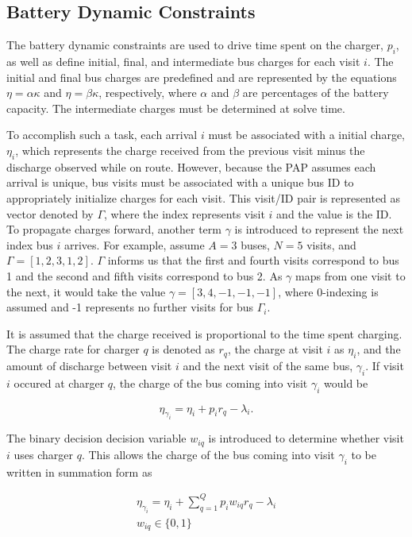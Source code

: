 \documentclass[letterpaper, 10pt, conference]{IEEEtran}
\begin{document}
\subsection{Battery Dynamic Constraints}
The battery dynamic constraints are used to drive time spent on the charger, $p_i$, as well as define initial, final, and intermediate bus charges for each visit $i$. The initial and final bus charges are predefined and are represented by the equations $\eta = \alpha \kappa$ and $\eta = \beta \kappa$, respectively, where $\alpha$ and $\beta$ are percentages of the battery capacity. The intermediate charges must be determined at solve time.

To accomplish such a task, each arrival $i$ must be associated with a initial charge, $\eta_i$, which represents the charge received from the previous visit minus the discharge observed while on route. However, because the PAP assumes each arrival is unique, bus visits must be associated with a unique bus ID to appropriately initialize charges for each visit. This visit/ID pair is represented as vector denoted by $\Gamma$, where the index represents visit $i$ and the value is the ID. To propagate charges forward, another term $\gamma$ is introduced to represent the next index bus $i$ arrives. For example, assume $A = 3$ buses, $N = 5$ visits, and $\Gamma = [1,2,3,1,2]$. $\Gamma$ informs us that the first and fourth visits correspond to bus 1 and the second and fifth visits correspond to bus 2. As $\gamma$ maps from one visit to the next, it would take the value $\gamma = [3,4,-1,-1,-1]$, where 0-indexing is assumed and -1 represents no further visits for bus $\Gamma_i$.

It is assumed that the charge received is proportional to the time spent charging. The charge rate for charger $q$ is denoted as $r_q$, the charge at visit $i$ as $\eta_i$, and the amount of discharge between visit $i$ and the next visit of the same bus, $\gamma_i$. If visit $i$ occured at charger $q$, the charge of the bus coming into visit $\gamma_i$ would be

\begin{equation}
	\eta_{\gamma_i} = \eta_i + p_i r_q - \lambda_i.
\end{equation}

The binary decision decision variable $w_{iq}$ is introduced to determine whether visit $i$ uses charger $q$. This allows the charge of the bus coming into visit $\gamma_i$ to be written in summation form as

\begin{subequations}
\begin{align}
    \eta_{\gamma_i} = \eta_i + \sum_{q=1}^Q p_i w_{iq} r_q - \lambda_i \\
    w_{iq} \in \{0,1\}
\end{align}
\end{subequations}
\end{document}

